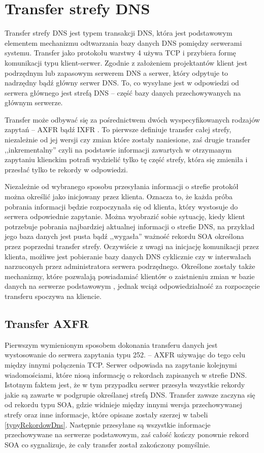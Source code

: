 \section{Transfer strefy DNS}
Transfer strefy DNS jest typem transakcji DNS, która jest podstawowym elementem mechanizmu odtwarzania bazy danych DNS pomiędzy
serwerami systemu. Transfer jako protokołu warstwy 4 używa TCP i przybiera formę komunikacji typu klient-serwer. Zgodnie z założeniem
projektantów klient jest podrzędnym lub zapasowym serwerem DNS a serwer, który odpytuje to nadrzędny bądź główny serwer DNS. To, co
wysyłane jest w odpowiedzi od serwera głównego jest strefą DNS -- część bazy danych przechowywanych na głównym serwerze.

Transfer może odbywać się za pośrednictwem dwóch wyspecyfikowanych rodzajów zapytań -- AXFR \cite{RFC1034, RFC5936} bądź
IXFR \cite{RFC1995}. To pierwsze definiuje transfer całej strefy, niezależnie od jej wersji czy zmian które zostały naniesione,
zaś drugie transfer ,,inkrementalny'' czyli na podstawie informacji zawartych w otrzymanym zapytaniu klienckim potrafi wydzielić
tylko tę część strefy, która się zmieniła i przesłać tylko te rekordy w odpowiedzi.

Niezależnie od wybranego sposobu przesyłania informacji o strefie protokół można określić jako inicjowany przez klienta. Oznacza to,
że każda próba pobrania informacji będzie rozpoczynała się od klienta, który wystosuje do serwera odpowiednie zapytanie. Można
wyobrazić sobie sytuację, kiedy klient potrzebuje pobrania najbardziej aktualnej informacji o strefie DNS, na przykład jego baza
danych jest pusta bądź ,,wygasła'' ważność rekordu SOA określona przez poprzedni transfer strefy. Oczywiście z uwagi na inicjację
komunikacji przez klienta, możliwe jest pobieranie bazy danych DNS cyklicznie czy w interwałach narzuconych przez administratora
serwera podrzędnego. Określone zostały także mechanizmy, które pozwalają powiadamiać klientów o zaistnieniu zmian w bazie danych
na serwerze podstawowym \cite{RFC5936, RFC1996}, jednak wciąż odpowiedzialność za rozpoczęcie transferu spoczywa na kliencie.

\subsection{Transfer AXFR}
Pierwszym wymienionym sposobem dokonania transferu danych jest wystosowanie do serwera zapytania typu 252. -- AXFR \cite{RFC5936}
używając do tego celu między innymi połączenia TCP. Serwer odpowiada na zapytanie kolejnymi wiadomościami, które niosą informację o
rekordach zapisanych w strefie DNS. Istotnym faktem jest, że w tym przypadku serwer przesyła wszystkie rekordy jakie są zawarte w
podgrupie określanej strefą DNS. Transfer zawsze zaczyna się od rekordu typu SOA, gdzie widnieje między innymi wersja przechowywanej
strefy oraz inne informacje, które opisane zostały szerzej w tabeli \ref{typyRekordowDns}. Następnie przesyłane są wszystkie informacje
przechowywane na serwerze podstawowym, zaś całość kończy ponownie rekord SOA co sygnalizuje, że cały transfer został zakończony pomyślnie.

